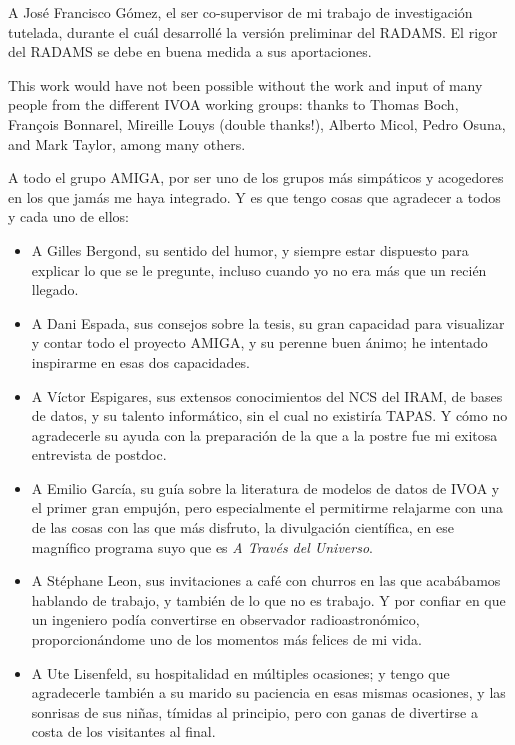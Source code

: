 	 A José Francisco Gómez, el ser co-supervisor de mi trabajo de
	investigación tutelada, durante el cuál desarrollé la versión
	preliminar del RADAMS. El rigor del RADAMS se debe en buena
	medida a sus aportaciones.
	
	 This work would have not been possible without the work and
	input of many people from the different IVOA working groups:
	thanks to Thomas Boch, François Bonnarel, Mireille Louys (double
	thanks!), Alberto Micol, Pedro Osuna, and Mark Taylor, among
	many others.
	
	 A todo el grupo AMIGA, por ser uno de los grupos más
	simpáticos y acogedores en los que jamás me haya integrado. Y
	es que tengo cosas que agradecer a todos y cada uno de ellos:
	
	\begin{itemize}
		\item A Gilles Bergond, su sentido del humor, y siempre
		estar dispuesto para explicar lo que se le pregunte,
		incluso cuando yo no era más que un recién llegado.
		
		 \item A Dani Espada, sus consejos sobre la tesis, su
		gran capacidad para visualizar y contar todo el proyecto
		AMIGA, y su perenne buen ánimo; he intentado inspirarme
		en esas dos capacidades.
		
		 \item A Víctor Espigares, sus extensos conocimientos del
		NCS del IRAM, de bases de datos, y su talento informático,
		sin el cual no existiría TAPAS. Y cómo no agradecerle su
		ayuda con la preparación de la que a la postre fue mi
		exitosa entrevista de postdoc.
		
		 \item A Emilio García, su guía sobre la literatura de
		modelos de datos de IVOA y el primer gran empujón, pero
		especialmente el permitirme relajarme con una de las cosas
		con las que más disfruto, la divulgación científica, en ese
		magnífico programa suyo que es \emph{A Través del
		Universo}.
		
		 \item A Stéphane Leon, sus invitaciones a café con churros
		en las que acabábamos hablando de trabajo, y también de lo
		que no es trabajo. Y por confiar en que un ingeniero podía
		convertirse en observador radioastronómico,
		proporcionándome uno de los momentos más felices de mi
		vida.
		
		 \item A Ute Lisenfeld, su hospitalidad en múltiples
		ocasiones; y tengo que agradecerle también a su marido su
		paciencia en esas mismas ocasiones, y las sonrisas de sus
		niñas, tímidas al principio, pero con ganas de divertirse a
		costa de los visitantes al final.
		

\end{itemize}
